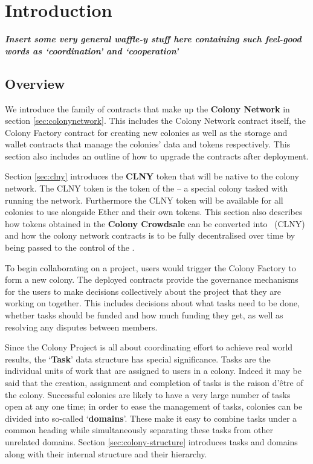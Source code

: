 \section{Introduction}


\textbf{\emph{Insert some very general waffle-y stuff here containing such feel-good words as `coordination' and `cooperation'}}

\subsection{Overview}


We introduce the family of contracts that make up the \textbf{Colony Network} in section \ref{sec:colonynetwork}. This includes the Colony Network contract itself, the Colony Factory contract for creating new colonies as well as the storage and wallet contracts that manage the colonies' data and tokens respectively. This section also includes an outline of how to upgrade the contracts after deployment.

Section \ref{sec:clny} introduces the \textbf{CLNY} token that will be native to the colony network. The CLNY token is the token of the \textbf{\rc} -- a special colony tasked with running the network. Furthermore the CLNY token will be available for all colonies to use alongside Ether and their own tokens. This section also describes how tokens obtained in the \textbf{Colony Crowdsale} can be converted into \rcts\ (CLNY) and how the colony network contracts is to be fully decentralised over time by being passed to the control of the \rc.

To begin collaborating on a project, users would trigger the Colony Factory to form a new colony. The deployed contracts provide the governance mechanisms for the users to make decisions collectively about the project that they are working on together. This includes decisions about what tasks need to be done, whether tasks should be funded and how much funding they get, as well as resolving any disputes between members.

Since the Colony Project is all about coordinating effort to achieve real world results, the `\textbf{Task}' data structure has special significance. Tasks are the individual units of work that are assigned to  users in a colony. Indeed it may be said that the creation, assignment and completion of tasks is the raison d'être of the colony. Successful colonies are likely to have a very large number of tasks open at any one time; in order to ease the management of tasks, colonies can be divided into so-called `\textbf{domains}'. These make it easy to combine tasks under a common heading while simultaneously separating these tasks from other unrelated domains. Section \ref{sec:colony-structure} introduces tasks and domains along with their internal structure and their hierarchy.

